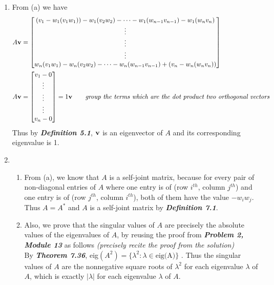 \documentclass{uofa-eng-assignment}
\begin{document}
\begin{enumerate}
\begin{enumerate}
	      	\item From (a) we have
	      	      \begin{align*}
	      	      	A\vb{v} & = 
	      	      	\begin{bmatrix}
	      	      	(v_1 - w_1 (v_1 w_1))  - w_1(v_2 w_2) - \dots - w_1 (w_{n-1} v_{n-1}) - w_1(w_n v_n)\\
	      	      	\vdots \\ 
	      	      	\vdots \\ 
	      	      	\vdots \\
	      	      	w_n (v_1 w_1)  - w_n(v_2 w_2) - \dots - w_n (w_{n-1} v_{n-1}) + (v_n - w_n(w_n v_n))\\
	      	      	\end{bmatrix} \\
	      	      	A\vb{v} & = 
	      	      	\begin{bmatrix}
	      	      	v_1 - 0 \\
	      	      	\vdots \\ 
	      	      	\vdots \\ 
	      	      	\vdots \\
	      	      	v_n - 0
	      	      	\end{bmatrix} = 1\vb{v} \qquad \text{\textit{group the terms which are the dot product two orthogonal vectors}}
	      	      \end{align*}         
	      	      Thus by \textbf{\textit{Definition 5.1}}, $\vb{v}$ is an eigenvector of $A$ and its corresponding eigenvalue is 1.
	      	\item \begin{enumerate}
	      	\item From (a), we know that $A$ is a self-joint matrix, because for every pair of non-diagonal entries of $A$ where one entry is of (row $i^{th}$, column $j^{th}$) and one entry is of (row $j^{th}$, column $i^{th}$), both of them have the value $-w_i w_j$. Thus $A = A^*$ and $A$ is a self-joint matrix by \textbf{\textit{Definition 7.1}}. 
	      	\item Also, we prove that the singular values of $A$ are precisely the absolute values of the eigenvalues of $A$, by reusing the proof from \textbf{\textit{Problem 2, Module 13}} as follows  \textit{(precisely recite the proof from the solution)} \\       
	      	      By \textbf{\textit{Theorem 7.36}}, eig$(A^2) = \{\lambda^2 : \lambda  \in \text{eig(A)} \}$ . Thus the singular values of $A$ are the nonnegative square roots of $\lambda^2$ for each eigenvalue $\lambda$ of $A$, which is exactly $|\lambda|$ for each eigenvalue $\lambda$ of $A$. 

\end{enumerate}
\end{enumerate}
\end{enumerate}
\end{document}
